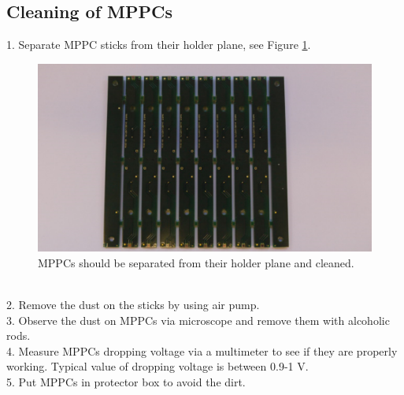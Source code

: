 \documentclass[a4paper]{article}\linespread{1.4}
\begin{document}
\subsection{Cleaning of MPPCs}
1.	Separate  MPPC sticks from their holder plane, see Figure \ref{fig:mppcs}.
\begin{figure}[h!] \hspace*{-0.5cm} \includegraphics[width=135mm,scale=2.0]{mppcspaint.png} \caption{MPPCs should be separated from their holder plane and cleaned.}  \label{fig:mppcs}\end{figure}
\\2.	Remove the dust on the sticks by using air pump.
\\3.	Observe the dust on MPPCs via microscope and remove them with alcoholic rods.
\\4.	Measure MPPCs dropping voltage via a multimeter to see if they are properly working. Typical value of dropping voltage is between 0.9-1 V.
\\5.	Put MPPCs in protector box to avoid the dirt.
\end{document}
